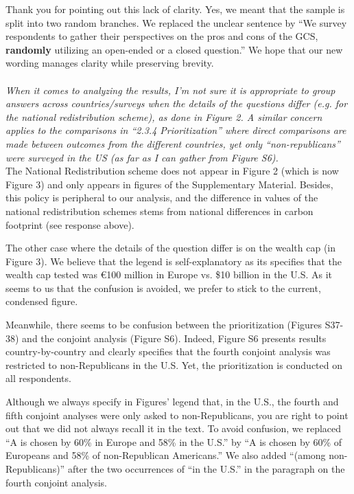 \documentclass[12pt,english]{article}
\begin{document}
Thank you for pointing out this lack of clarity. Yes, we meant that the sample is split into two random branches. We replaced the unclear sentence by ``We survey respondents to gather their perspectives on the pros and cons of the GCS, \textbf{randomly} utilizing an open-ended or a closed question.'' We hope that our new wording manages clarity while preserving brevity.
~\\ ~\\

\textit{When it comes to analyzing the results, I’m not sure it is appropriate to group answers across countries/surveys when the details of the questions differ (e.g. for the national redistribution scheme), as done in Figure 2. A similar concern applies to the comparisons in “2.3.4 Prioritization” where direct comparisons are made between outcomes from the different countries, yet only “non-republicans” were surveyed in the US (as far as I can gather from Figure S6).}~\\

The National Redistribution scheme does not appear in Figure 2 (which is now Figure 3) and only appears in figures of the Supplementary Material. Besides, this policy is peripheral to our analysis, and the difference in values of the national redistribution schemes stems from national differences in carbon footprint (see response above). 

The other case where the details of the question differ is on the wealth cap (in Figure 3). We believe that the legend is self-explanatory as its specifies that the wealth cap tested was \euro{}100 million in Europe vs. \$10 billion in the U.S. As it seems to us that the confusion is avoided, we prefer to stick to the current, condensed figure.

Meanwhile, there seems to be confusion between the prioritization (Figures S37-38) %
and the conjoint analysis (Figure S6). Indeed, Figure S6 presents results country-by-country and clearly specifies that the fourth conjoint analysis was restricted to non-Republicans in the U.S. Yet, the prioritization is conducted on all respondents.

Although we always specify in Figures' legend that, in the U.S., the fourth and fifth conjoint analyses were only asked to non-Republicans, you are right to point out that we did not always recall it in the text. To avoid confusion, we replaced ``A is chosen by 60\% in Europe and 58\% in the U.S.'' by ``A is chosen by 60\% of Europeans and 58\% of non-Republican Americans.'' We also added ``(among non-Republicans)'' after the two occurrences of ``in the U.S.'' in the paragraph on the fourth conjoint analysis.
~\\ ~\\
\end{document}
